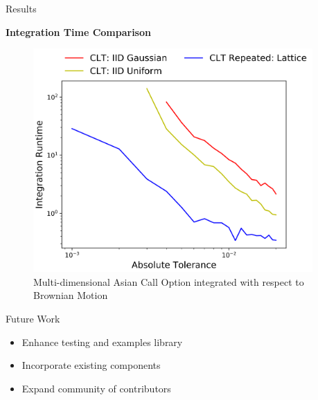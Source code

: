 \documentclass[final]{beamer}
\newcommand{\bfCenter}[1]{\centerline{\textbf{#1}}}
\newlength{\sepwid}
\newlength{\onecolwid}
\begin{document}
\begin{frame}[t]
\begin{columns}[t]
\vspace{-.5in}
\begin{column}{\sepwid}\end{column}
\begin{column}{\onecolwid}\vspace{-.3in}
\begin{block}{Results}
    \bfCenter{Integration Time Comparison}
    \begin{figure}
        \includegraphics[width=.8\textwidth]{Images/AbsTol_Runtime_LinePlot.png}
        \caption{Multi-dimensional Asian Call Option integrated with respect to  Brownian Motion}
    \end{figure}
\end{block}

\begin{block}{Future Work}
    \begin{itemize}
        \item Enhance testing and examples library
        \item Incorporate existing components
        \item Expand community of contributors
    \end{itemize}
\end{block}


\end{column}
\end{columns}
\end{frame}
\end{document}
